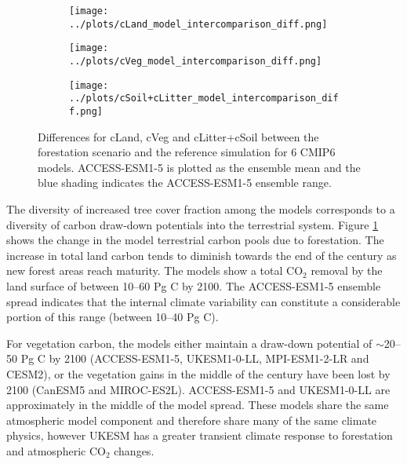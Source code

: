 \documentclass[]{article}
\begin{document}
\begin{figure}[H]
    \centering
    \begin{subfigure}[b]{0.45\linewidth}
        \texttt{[image: ../plots/cLand\_model\_intercomparison\_diff.png]}
    \end{subfigure}
    \begin{subfigure}[b]{0.45\linewidth}
        \texttt{[image: ../plots/cVeg\_model\_intercomparison\_diff.png]}
    \end{subfigure}
    \begin{subfigure}[b]{0.45\linewidth}
        \texttt{[image: ../plots/cSoil+cLitter\_model\_intercomparison\_diff.png]}
    \end{subfigure}
    \caption{Differences for cLand, cVeg and cLitter+cSoil between the forestation scenario and the reference simulation for 6 CMIP6 models. ACCESS-ESM1-5 is plotted as the ensemble mean and the blue shading indicates the ACCESS-ESM1-5 ensemble range.}
    \label{fig:models_cpools}
\end{figure}

The diversity of increased tree cover fraction among the models corresponds to a diversity of carbon draw-down potentials into the terrestrial system.
Figure \ref{fig:models_cpools} shows the change in the model terrestrial carbon pools due to forestation.
The increase in total land carbon tends to diminish towards the end of the century as new forest areas reach maturity.
The models show a total CO$_2$ removal by the land surface of between 10--60 Pg C by 2100.
The ACCESS-ESM1-5 ensemble spread indicates that the internal climate variability can constitute a considerable portion of this range (between 10--40 Pg C).

For vegetation carbon, the models either maintain a draw-down potential of $\sim$20--50 Pg C by 2100 (ACCESS-ESM1-5, UKESM1-0-LL, MPI-ESM1-2-LR and CESM2), or the vegetation gains in the middle of the century have been lost by 2100 (CanESM5 and MIROC-ES2L).
ACCESS-ESM1-5 and UKESM1-0-LL are approximately in the middle of the model spread.
These models share the same atmospheric model component and therefore share many of the same climate physics, however UKESM has a greater transient climate response to forestation and atmospheric CO$_2$ changes.
\end{document}
